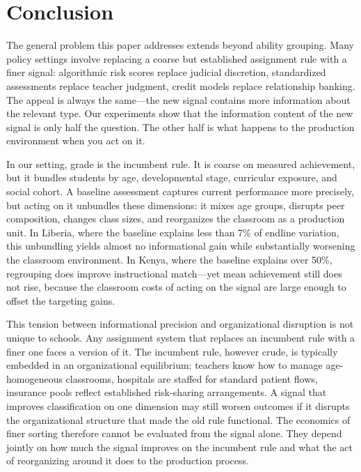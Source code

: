 \documentclass[11pt]{article}
\begin{document}

\section{Conclusion}
\label{sec:conclusion}

The general problem this paper addresses extends beyond ability grouping. Many policy settings involve replacing a coarse but established assignment rule with a finer signal: algorithmic risk scores replace judicial discretion, standardized assessments replace teacher judgment, credit models replace relationship banking. The appeal is always the same---the new signal contains more information about the relevant type. Our experiments show that the information content of the new signal is only half the question. The other half is what happens to the production environment when you act on it.

In our setting, grade is the incumbent rule. It is coarse on measured achievement, but it bundles students by age, developmental stage, curricular exposure, and social cohort. A baseline assessment captures current performance more precisely, but acting on it unbundles these dimensions: it mixes age groups, disrupts peer composition, changes class sizes, and reorganizes the classroom as a production unit. In Liberia, where the baseline explains less than 7\% of endline variation, this unbundling yields almost no informational gain while substantially worsening the classroom environment. In Kenya, where the baseline explains over 50\%, regrouping does improve instructional match---yet mean achievement still does not rise, because the classroom costs of acting on the signal are large enough to offset the targeting gains.

This tension between informational precision and organizational disruption is not unique to schools. Any assignment system that replaces an incumbent rule with a finer one faces a version of it. The incumbent rule, however crude, is typically embedded in an organizational equilibrium: teachers know how to manage age-homogeneous classrooms, hospitals are staffed for standard patient flows, insurance pools reflect established risk-sharing arrangements. A signal that improves classification on one dimension may still worsen outcomes if it disrupts the organizational structure that made the old rule functional. The economics of finer sorting therefore cannot be evaluated from the signal alone. They depend jointly on how much the signal improves on the incumbent rule and what the act of reorganizing around it does to the production process.
\end{document}
